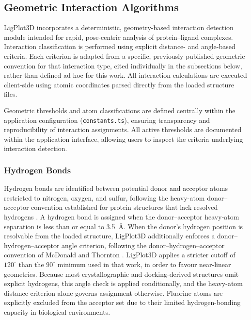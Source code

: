 \documentclass[journal=jacsat,manuscript=article]{achemso}
\begin{document}
\subsection{Geometric Interaction Algorithms}
LigPlot3D incorporates a deterministic, geometry-based interaction detection module intended for rapid, pose-centric analysis of protein--ligand complexes. Interaction classification is performed using explicit distance- and angle-based criteria. Each criterion is adapted from a specific, previously published geometric convention for that interaction type, cited individually in the subsections below, rather than defined ad hoc for this work. All interaction calculations are executed client-side using atomic coordinates parsed directly from the loaded structure files.

Geometric thresholds and atom classifications are defined centrally within the application configuration (\texttt{constants.ts}), ensuring transparency and reproducibility of interaction assignments. All active thresholds are documented within the application interface, allowing users to inspect the criteria underlying interaction detection.

\subsubsection{Hydrogen Bonds}
Hydrogen bonds are identified between potential donor and acceptor atoms restricted to nitrogen, oxygen, and sulfur, following the heavy-atom donor–acceptor convention established for protein structures that lack resolved hydrogens \cite{baker1984hydrogen}. A hydrogen bond is assigned when the donor–acceptor heavy-atom separation is less than or equal to 3.5~\AA. When the donor's hydrogen position is resolvable from the loaded structure, LigPlot3D additionally enforces a donor–hydrogen–acceptor angle criterion, following the donor–hydrogen–acceptor convention of McDonald and Thornton \cite{mcdonald1994satisfying}. LigPlot3D applies a stricter cutoff of $120^{\circ}$ than the $90^{\circ}$ minimum used in that work, in order to favour near-linear geometries. Because most crystallographic and docking-derived structures omit explicit hydrogens, this angle check is applied conditionally, and the heavy-atom distance criterion alone governs assignment otherwise. Fluorine atoms are explicitly excluded from the acceptor set due to their limited hydrogen-bonding capacity in biological environments.
\end{document}
